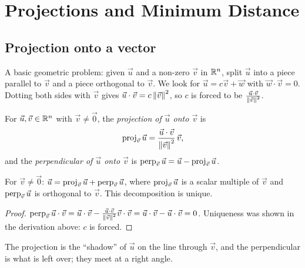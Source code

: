 \chapter{Projections and Minimum Distance}

\section{Projection onto a vector}

A basic geometric problem: given $\vec u$ and a non-zero $\vec v$ in $\mathbb{R}^n$, split $\vec u$ into a
piece parallel to $\vec v$ and a piece orthogonal to $\vec v$. We look for
$\vec u = c\vec v + \vec w$ with $\vec w\cdot\vec v=0$. Dotting both sides with $\vec v$ gives
$\vec u\cdot\vec v = c\left\lVert \vec v \right\rVert^2$, so $c$ is forced to be $\frac{\vec u\cdot\vec v}{\left\lVert \vec v \right\rVert^2}$.

\begin{definition}
For $\vec u,\vec v\in\mathbb{R}^n$ with $\vec v\ne\vec 0$, the \emph{projection of $\vec u$ onto $\vec v$} is
\[
  \operatorname{proj}_{\vec v}\vec u = \frac{\vec u\cdot\vec v}{\left\lVert \vec v \right\rVert^2}\,\vec v ,
\]
and the \emph{perpendicular of $\vec u$ onto $\vec v$} is $\operatorname{perp}_{\vec v}\vec u = \vec u - \operatorname{proj}_{\vec v}\vec u$.
\end{definition}

\begin{theorem}
For $\vec v\ne\vec 0$: $\vec u = \operatorname{proj}_{\vec v}\vec u + \operatorname{perp}_{\vec v}\vec u$, where
$\operatorname{proj}_{\vec v}\vec u$ is a scalar multiple of $\vec v$ and $\operatorname{perp}_{\vec v}\vec u$ is orthogonal
to $\vec v$. This decomposition is unique.
\end{theorem}
\begin{proof}
$\operatorname{perp}_{\vec v}\vec u\cdot\vec v = \vec u\cdot\vec v - \frac{\vec u\cdot\vec v}{\left\lVert \vec v \right\rVert^2}\vec v\cdot\vec v
= \vec u\cdot\vec v-\vec u\cdot\vec v=0$. Uniqueness was shown in the derivation above: $c$ is forced.
\end{proof}

\begin{center}
\end{center}
The projection is the ``shadow'' of $\vec u$ on the line through $\vec v$, and the perpendicular
is what is left over; they meet at a right angle.

